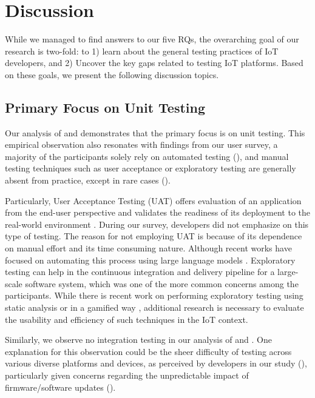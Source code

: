 \section{Discussion}

While we managed to find answers to our five RQs, the overarching goal of our research is two-fold: to 1) learn about the general testing practices of IoT developers, and 2) Uncover the key gaps related to testing IoT platforms. 
Based on these goals, we present the following discussion topics.

\subsection{Primary Focus on Unit Testing}
Our analysis of  \openhab and \homeassistant demonstrates that the primary focus is on unit testing. This empirical observation also resonates with findings from our user survey, \ie a majority of the participants solely rely on automated testing (), and manual testing techniques such as user acceptance or exploratory testing are generally absent from practice, except in rare cases (). 

Particularly, User Acceptance Testing (UAT) offers evaluation of an application from the end-user perspective and validates the readiness of its deployment to the real-world environment \cite{wang24}. During our survey, \iot developers did not emphasize on this type of testing. The reason for not employing UAT is because of its dependence on manual effort and its time consuming nature. Although recent works have focused on automating this process using large language models \cite{wang24}. Exploratory testing can help in the continuous integration and delivery pipeline for a large-scale software system\cite{maartensson2022chapter}, which was one of the more common concerns among the participants. 
While there is recent work on performing exploratory testing using static analysis \cite{doyle23} or in a gamified way \cite{coppola24}, additional research is necessary to evaluate the usability and efficiency of such techniques in the IoT context.

Similarly, we observe no integration testing in our analysis of \openhab and \homeassistant.
One explanation for this observation could be the sheer difficulty of testing across various diverse platforms and devices, as perceived by developers in our study (), particularly given concerns regarding the unpredictable impact of firmware/software updates ().


